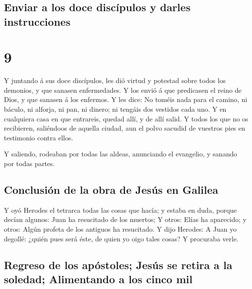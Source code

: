 \hypertarget{enviar-a-los-doce-discuxedpulos-y-darles-instrucciones}{%
\subsection{Enviar a los doce discípulos y darles
instrucciones}\label{enviar-a-los-doce-discuxedpulos-y-darles-instrucciones}}

\hypertarget{section-8}{%
\section{9}\label{section-8}}

 Y juntando á sus doce discípulos, les dió virtud y
potestad sobre todos los demonios, y que sanasen enfermedades.
 Y los envió á que predicasen el reino de Dios, y que
sanasen á los enfermos.  Y les dice: No toméis nada para
el camino, ni báculo, ni alforja, ni pan, ni dinero; ni tengáis dos
vestidos cada uno.  Y en cualquiera casa en que entrareis,
quedad allí, y de allí salid.  Y todos los que no os
recibieren, saliéndoos de aquella ciudad, aun el polvo sacudid de
vuestros pies en testimonio contra ellos.

 Y saliendo, rodeaban por todas las aldeas, anunciando el
evangelio, y sanando por todas partes.

\hypertarget{conclusiuxf3n-de-la-obra-de-jesuxfas-en-galilea}{%
\subsection{Conclusión de la obra de Jesús en
Galilea}\label{conclusiuxf3n-de-la-obra-de-jesuxfas-en-galilea}}

 Y oyó Herodes el tetrarca todas las cosas que hacía; y
estaba en duda, porque decían algunos: Juan ha resucitado de los
muertos;  Y otros: Elías ha aparecido; y otros: Algún
profeta de los antiguos ha resucitado.  Y dijo Herodes: A
Juan yo degollé: ¿quién pues será éste, de quien yo oigo tales cosas? Y
procuraba verle.

\hypertarget{regreso-de-los-apuxf3stoles-jesuxfas-se-retira-a-la-soledad-alimentando-a-los-cinco-mil}{%
\subsection{Regreso de los apóstoles; Jesús se retira a la soledad;
Alimentando a los cinco
mil}\label{regreso-de-los-apuxf3stoles-jesuxfas-se-retira-a-la-soledad-alimentando-a-los-cinco-mil}}

